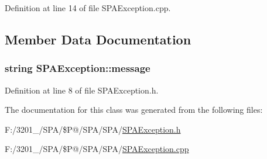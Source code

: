 Definition at line 14 of file S\-P\-A\-Exception.\-cpp.



\subsection{Member Data Documentation}
\hypertarget{class_s_p_a_exception_a01dacc987941a94c516cb08988dc7d51}{
\subsubsection[{message}]{\setlength{\rightskip}{0pt plus 5cm}string S\-P\-A\-Exception\-::message}}\label{class_s_p_a_exception_a01dacc987941a94c516cb08988dc7d51}


Definition at line 8 of file S\-P\-A\-Exception.\-h.



The documentation for this class was generated from the following files\-:\begin{DoxyCompactItemize}
\item 
F\-:/3201\-\_/\-S\-P\-A/\$\-P@/\-S\-P\-A/\-S\-P\-A/\hyperlink{_s_p_a_exception_8h}{S\-P\-A\-Exception.\-h}\item 
F\-:/3201\-\_/\-S\-P\-A/\$\-P@/\-S\-P\-A/\-S\-P\-A/\hyperlink{_s_p_a_exception_8cpp}{S\-P\-A\-Exception.\-cpp}\end{DoxyCompactItemize}
